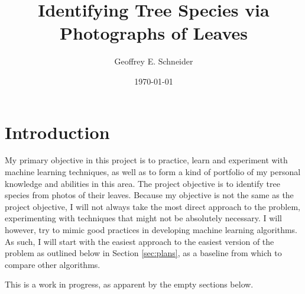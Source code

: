 \documentclass[12pt]{article}
\title{Identifying Tree Species via Photographs of Leaves}
\date{\today}
\author{Geoffrey E. Schneider}
\begin{document}
\maketitle
\section{Introduction} My primary objective in this project is to practice, learn and experiment with machine learning techniques, as well as to form a kind of portfolio of my personal knowledge and abilities in this area. The project objective is to identify tree species from photos of their leaves. Because my objective is not the same as the project objective, I will not always take the most direct approach to the problem, experimenting with techniques that might not be absolutely necessary. I will however, try to mimic good practices in developing machine learning algorithms. As such, I will start with the easiest approach to the easiest version of the problem as outlined below in Section \ref{sec:plans}, as a baseline from which to compare other algorithms.

This is a work in progress, as apparent by the empty sections below.

%
%
%
\end{document}

